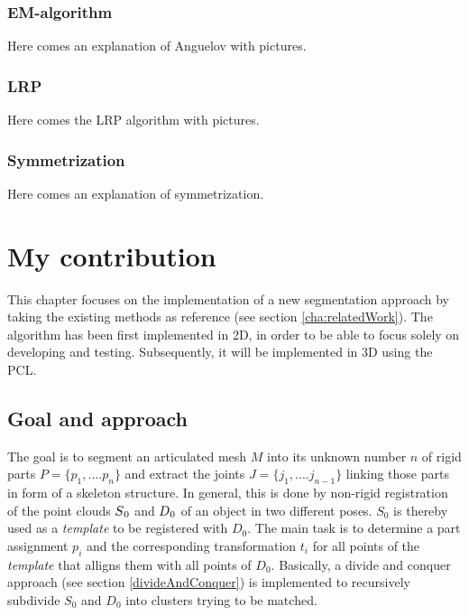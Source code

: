 \documentclass[a4paper,english,11pt]{report}
\begin{document}
\subsection{EM-algorithm}

Here comes an explanation of Anguelov with pictures.

\subsection{LRP}

Here comes the LRP algorithm with pictures.

\subsection{Symmetrization}

Here comes an explanation of symmetrization.

\chapter{My contribution}
\label{cha:MyContribution}

This chapter focuses on the implementation of a new segmentation approach by taking the existing methods as reference (see section \ref{cha:relatedWork}). The algorithm has been first implemented in 2D, in order to be able to focus solely on developing and testing. Subsequently, it will be implemented in 3D using the PCL.

\section{Goal and approach}

The goal is to segment an articulated mesh $M$ into its unknown number $n$ of rigid parts $ P =  \{ {p_1,....p_n}\}$ and extract the joints $ J =  \{ {j_1,....j_{n-1}}\}$ linking those parts in form of a skeleton structure. In general, this is done by non-rigid registration of the point clouds $S\textsubscript{0}$ and $D\textsubscript{0}$ of an object in two different poses. $S_0$ is thereby used as a \textit{template} to be registered with $D_0$. The main task is to determine a part assignment $p_i$ and the corresponding transformation $t_i$ for all points of the \textit{template} that alligns them with all points of $D_0$. Basically, a divide and conquer approach (see section \ref{divideAndConquer}) is implemented to recursively subdivide $S_0$ and $D_0$ into clusters trying to be matched.
\end{document}
